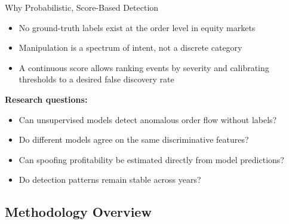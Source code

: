 \documentclass{beamer}
\begin{document}
\begin{frame}{Why Probabilistic, Score-Based Detection}
    \begin{itemize}
        \item No ground-truth labels exist at the order level in equity markets
        \item Manipulation is a spectrum of intent, not a discrete category
        \item A continuous score allows ranking events by severity and calibrating thresholds to a desired false discovery rate
    \end{itemize}

    \textbf{Research questions:}
    \begin{itemize}
        \item Can unsupervised models detect anomalous order flow without labels?
        \item Do different models agree on the same discriminative features?
        \item Can spoofing profitability be estimated directly from model predictions?
        \item Do detection patterns remain stable across years?
    \end{itemize}
\end{frame}


\subsection{Methodology Overview}
\end{document}
